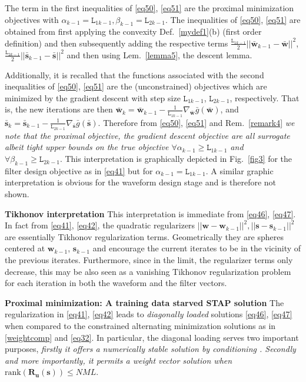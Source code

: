 \documentclass[11pt,draftclsnofoot,onecolumn]{IEEEtran}
\theoremstyle{definition}
\theoremstyle{remark}
\begin{document}
The term in the first inequalities of \eqref{eq50}, \eqref{eq51} are the proximal minimization objectives with $\alpha_{k-1}=\mathtt{L}_{1k-1},\beta_{k-1}=\mathtt{L}_{2k-1}$. The  inequalities of \eqref{eq50}, \eqref{eq51}  are obtained from first applying the convexity Def.~\ref{mydef1}(b) (first order definition) and then subsequently adding the respective terms $\tfrac{\mathtt{L}_{1k-1}}{2}||\mathbf{\bar{w}}_{k-1}-\mathbf{\bar{w}} ||^2$, $ \tfrac{\mathtt{L}_{2k-1}}{2}||\mathbf{\bar{s}}_{k-1}-\mathbf{\bar{s}}||^2$ and then using  Lem.~\ref{lemma5}, the descent lemma. 

Additionally, it is recalled that the functions associated with the second  inequalities of \eqref{eq50}, \eqref{eq51} are the  (unconstrained) objectives which are minimized by the gradient descent with step size $\mathtt{L}_{1k-1}$, $\mathtt{L}_{2k-1}$, respectively. That is, the new iterations are then $\mathbf{\bar{w}}_{k}=\mathbf{\bar{w}}_{k-1}-\frac{1}{\mathtt{L}_{1k-1}} \nabla_{\mathbf{\bar{w}}}\bar{g}( \mathbf{\bar{w}})$, and  $\mathbf{\bar{s}}_{k}=\mathbf{\bar{s}}_{k-1}-\frac{1}{\mathtt{L}_{2k-1}} \nabla_{\mathbf{\bar{s}}}\bar{g}( \mathbf{\bar{s}})$. Therefore from \eqref{eq50}, \eqref{eq51} and Rem.~\ref{remark4} {\it we note that the proximal objective, the gradient descent objective are all surrogate albeit tight upper bounds on the true objective $\forall \alpha_{k-1}\geq\mathtt{L}_{1k-1}$ and $\forall \beta_{k-1}\geq\mathtt{L}_{2k-1}$}. This interpretation is graphically depicted in Fig.~\ref{fig3} for the filter design objective as in \eqref{eq41} but for $\alpha_{k-1}=\mathtt{L}_{1k-1}$. A similar graphic interpretation is obvious for the waveform design stage and is therefore not shown.

{\bf Tikhonov interpretation} This interpretation is immediate from \eqref{eq46}, \eqref{eq47}. In fact from \eqref{eq41}, \eqref{eq42},  the quadratic  regularizers $||\mathbf{w}-\mathbf{w}_{k-1} ||^2, || \mathbf{s}-\mathbf{s}_{k-1} ||^2$ are essentially Tikhonov regularization terms. Geometrically they are spheres centered at $\mathbf{w}_{k-1}$, $\mathbf{s}_{k-1}$ and encourage the current iterates to be in the vicinity of the previous iterates. Furthermore, since in the limit, the regularizer terms only decrease, this may be also seen as a vanishing Tikhonov regularization problem \cite{Parikh2013} for each iteration in both the waveform and the filter vectors.

{\bf Proximal minimization: A training data starved STAP solution} The regularization in \eqref{eq41}, \eqref{eq42} leads to {\it diagonally loaded} solutions \eqref{eq46}, \eqref{eq47} when compared to the constrained alternating minimization solutions as in \eqref{weightcomp} and \eqref{eq32}. In particular, the diagonal loading serves two important purposes, {\it firstly it offers a numerically stable solution by conditioning . Secondly and more importantly, it permits a weight vector solution when $\mathrm{rank}( \mathbf{R_u}(\mathbf{s}))\leq NML$}.   
\end{document}
